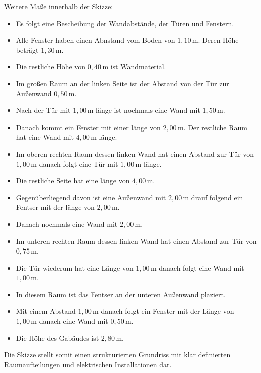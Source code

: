 \documentclass{article}
\begin{document}
Weitere Maße innerhalb der Skizze:
\begin{itemize}
   \item Es folgt eine Bescheibung der Wandabstände, der Türen und Fenstern. 
   \item Alle Fenster haben einen Abnstand vom Boden von $1{,}10\,\text{m}$. Deren Höhe beträgt $1{,}30\,\text{m}$. 
   \item Die restliche Höhe von $0{,}40\,\text{m}$ ist Wandmaterial.
   \item Im großen Raum an der linken Seite ist der Abstand von der Tür zur Außenwand $0{,}50\,\text{m}$.
   \item Nach der Tür mit $1{,}00\,\text{m}$ länge ist nochmals eine Wand mit $1{,}50\,\text{m}$.
   \item Danach kommt ein Fenster mit einer länge von $2{,}00\,\text{m}$. Der restliche Raum hat eine Wand mit $4{,}00\,\text{m}$ länge. 
   \item Im oberen rechten Raum dessen linken Wand hat einen Abstand zur Tür von $1{,}00\,\text{m}$ danach folgt eine Tür mit $1{,}00\,\text{m}$ länge.
   \item Die restliche Seite hat eine länge von $4{,}00\,\text{m}$.
   \item Gegenüberliegend davon ist eine Außenwand mit $2{,}00\,\text{m}$ drauf folgend ein Fentser mit der länge von $2{,}00\,\text{m}$.
   \item Danach nochmals eine Wand mit $2{,}00\,\text{m}$. 
   \item Im unteren rechten Raum dessen linken Wand hat einen Abstand zur Tür von $0{,}75\,\text{m}$.
   \item Die Tür wiederum hat eine Länge von $1{,}00\,\text{m}$ danach folgt eine Wand mit $1{,}00\,\text{m}$.
   \item In diesem Raum ist das Fentser an der unteren Außenwand plaziert.
   \item Mit einem Abstand $1{,}00\,\text{m}$ danach folgt ein Fenster mit der Länge von $1{,}00\,\text{m}$ danach eine Wand mit $0{,}50\,\text{m}$.
   \item Die Höhe des Gabäudes ist $2{,}80\,\text{m}$.
\end{itemize}

Die Skizze stellt somit einen strukturierten Grundriss mit klar definierten Raumaufteilungen und elektrischen Installationen dar.
\end{document}
